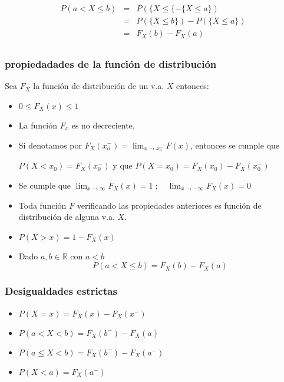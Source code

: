\documentclass[
]{article}
\begin{document}
\[\begin{array}{rcl}
  P(a<X\leq b)&=&P( \lbrace X\leq \lbrace - \lbrace X \leq a \rbrace )\\
  &=&P( \lbrace X \leq b \rbrace ) - P( \lbrace X \leq a \rbrace )\\
  &=&F_X(b)-F_X(a)\\
\end{array}\]

\hypertarget{propiedadades-de-la-funciuxf3n-de-distribuciuxf3n}{%
\subsubsection{propiedadades de la función de
distribución}\label{propiedadades-de-la-funciuxf3n-de-distribuciuxf3n}}

Sea \(F_X\) la función de distribución de un v.a. \(X\) entonces:

\begin{itemize}
\item $0\leq F_X(x) \leq 1$
\item La función $F_x$ es no decreciente.
\item Si denotamos por $F_X(x_o^-) = \displaystyle\lim_{x\to x_o^-} F(x)$, entonces se cumple que 

$P(X<x_0) = F_X(x_0^-)$ y que $P(X=x_0) = F_X(x_0) - F_X(x_0^-)$
\item Se cumple que $\displaystyle\lim_{x\to\infty} F_X(x)=1\;; \quad \lim_{x\to -\infty}F_X(x)=0$
\item Toda función $F$ verificando las propiedades anteriores es función de distribución de alguna v.a. $X$.
\item $P(X>x) = 1-F_X(x)$
\item Dado $a,b\in \mathbb{R}$ con $a < b$
$$P(a<X\leq b) = F_X(b) - F_X(a)$$
\end{itemize}

\hypertarget{desigualdades-estrictas}{%
\subsubsection{Desigualdades estrictas}\label{desigualdades-estrictas}}

\begin{itemize}
\item $P(X=x) = F_X(x)-F_X(x^-)$
\item $P(a<X<b) = F_X(b^-) - F_X(a)$
\item $P(a\leq X < b) = F_X(b^-) - F_X(a^-)$
\item $P(X<a)=F_X(a^-)$
\end{itemize}
\end{document}
